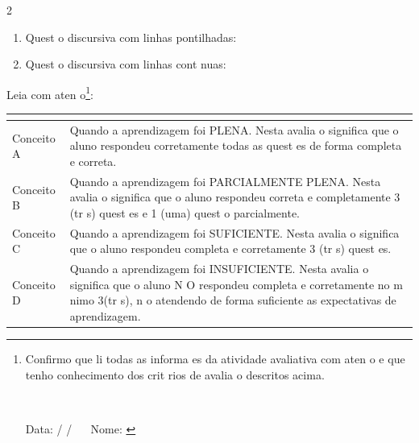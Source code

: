 \documentclass{article}
\begin{document}
\begin{multicols}{2}
\begin{enumerate}
\item Quest o discursiva com linhas pontilhadas:

\dotfill

\dotfill

\dotfill

\dotfill

\item Quest o discursiva com linhas cont nuas:

\hrulefill

\hrulefill

\hrulefill

\hrulefill

\end{enumerate}

\end{multicols}

\newpage %

Leia com aten o\footnote{Confirmo que li todas as informa es da atividade avaliativa com aten o e que tenho conhecimento dos crit rios de avalia o descritos acima.

\

Data: \underline{\hspace{0.7cm}} / \underline{\hspace{0.7cm}} / \underline{\hspace{0.7cm}} $\quad$ Nome: \underline{\hspace{11cm}}}:

\begin{center}
    \begin{tabular}{ | l | p{15cm} |}
\multicolumn{2}{l}{}\\    
\hline
Conceito A &  Quando 	a aprendizagem foi PLENA. Nesta avalia o significa que o aluno respondeu corretamente todas as quest es de forma completa e correta.\\
\hline
Conceito B & Quando 	a aprendizagem foi PARCIALMENTE PLENA. Nesta avalia o significa que o aluno respondeu correta e completamente 3 (tr s) quest es e 1 (uma) quest o parcialmente.\\
\hline
Conceito C     &  Quando 	a aprendizagem foi SUFICIENTE. Nesta avalia o significa que o aluno respondeu completa e corretamente 3 (tr s) quest es.\\
\hline
Conceito D     & Quando 	a aprendizagem foi INSUFICIENTE. Nesta avalia o significa que o aluno N O 	respondeu completa e corretamente no m nimo 3(tr s), n o atendendo de forma suficiente as expectativas de aprendizagem. \\
    \hline
    \end{tabular}
\end{center}
\end{document}
